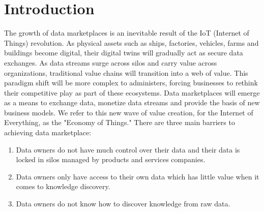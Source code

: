 \documentclass[journal,article,applsci,submit,moreauthors,pdftex]{Definitions/mdpi}
\begin{document}



\section{Introduction}
The growth of data marketplaces is an inevitable result of the IoT (Internet of Things) revolution. As physical assets such as ships, factories, vehicles, farms and buildings become digital, their digital twins will gradually act as secure data exchanges.\cite{digitaltwin}\cite{AutonomousDriving} As data streams surge across silos and carry value across organizations, traditional value chains will transition into a web of value. This paradigm shift will be more complex to administers, forcing businesses to rethink their competitive play as part of these ecosystems. Data marketplaces will emerge as a means to exchange data, monetize data streams and provide the basis of new business models. We refer to this new wave of value creation, for the Internet of Everything, as the "Economy of Things." There are three main barriers to achieving data marketplace:
\begin{enumerate}[leftmargin=*,labelsep=4.9mm]
    \item Data owners do not have much control over their data and their data is locked in silos managed by products and services companies.
    \item Data owners only have access to their own data which has little value when it comes to knowledge discovery.
    \item Data owners do not know how to discover knowledge from raw data.
\end{enumerate}
\end{document}
